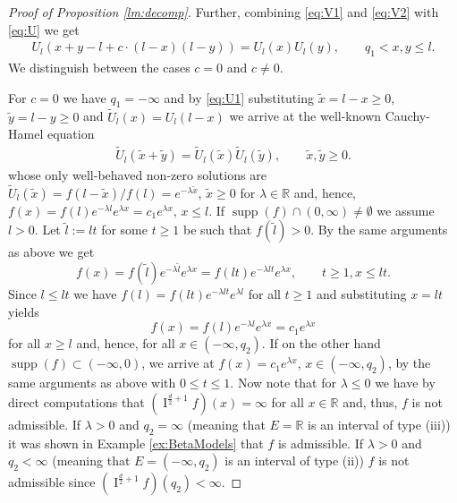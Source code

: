 \documentclass[11pt,a4paper]{article}
\theoremstyle{plain}
\theoremstyle{definition}
\theoremstyle{remark}
\DeclareMathOperator\supp{supp}
\def\RR{\mathbb{R}}
\newcommand{\frI}{\mathop{\mathrm{I}}\nolimits}
\begin{document}
\begin{proof}[Proof of Proposition \ref{lm:decomp}]
    Further, combining \eqref{eq:V1} and \eqref{eq:V2} with \eqref{eq:U} we get
    \begin{align}\label{eq:U1}
        U_l(x+y-l+c\cdot (l-x)(l-y))=U_l(x)U_l(y),\qquad q_1< x,y\leq l.    
    \end{align}
    We distinguish between the cases $c=0$ and $c \neq 0$. 
    
    For $c=0$ we have $q_1=-\infty$ and by \eqref{eq:U1} substituting $\tilde x=l-x\ge 0$, $\tilde y=l-y\ge 0$ and $\tilde U_l(x)=U_l(l-x)$ we arrive at the well-known Cauchy-Hamel equation
    \begin{align*}
        \tilde U_l(\tilde x+\tilde y)=\tilde U_l(\tilde x)\tilde U_l(\tilde y),\qquad \tilde x,\tilde y\ge 0.
    \end{align*}
    whose only well-behaved non-zero solutions are $\tilde U_l(\tilde{x})=f(l-\tilde x)/f(l)=e^{-\lambda \tilde{x}}$, $\tilde x\ge 0$ for $\lambda \in \RR$ and, hence, $f(x)=f(l)e^{-\lambda l}e^{\lambda x}=c_1e^{\lambda x}$, $x\leq l$. If $\supp (f) \cap (0,\infty) \neq \emptyset$ we assume $l>0$. Let $\widetilde{l}:=lt$ for some $t\ge 1$ be such that $f(\widetilde{l})>0$. By the same arguments as above we get
    \[
        f(x)=f(\widetilde{l})e^{-\lambda \widetilde{l}}e^{\lambda x}=f(lt)e^{-\lambda lt}e^{\lambda x},\qquad t\ge 1, x\le lt.
    \]
    Since $l\le lt$ we have $f(l)=f(lt)e^{-\lambda lt } e^{\lambda l}$ for all $t\ge 1$ and substituting $x=lt$ yields
    \[
        f(x)=f(l)e^{-\lambda l} e^{\lambda x }=c_1e^{\lambda x}
    \]
    for all $x\ge l$ and, hence, for all $x\in(-\infty,q_2)$. If on the other hand $\supp(f) \subset (-\infty,0)$, we arrive at $f(x)=c_1e^{\lambda x}$, $x\in (-\infty,q_2)$, by the same arguments as above with $0\le t \le 1$. Now note that for $\lambda \le 0$ we have by direct computations that $(\frI^{\frac{d}{2}+1}f)(x)=\infty$ for all $x\in \RR$ and, thus, $f$ is not admissible. If $\lambda>0$ and $q_2=\infty$ (meaning that $E=\RR$ is an interval of type (iii)) it was shown in Example \ref{ex:BetaModels} that $f$ is admissible. If $\lambda>0$ and $q_2<\infty$ (meaning that $E=(-\infty,q_2)$ is an interval of type (ii)) $f$ is not admissible since $(\frI^{\frac{d}{2}+1}f)(q_2)<\infty$.
    

\end{proof}
\end{document}
